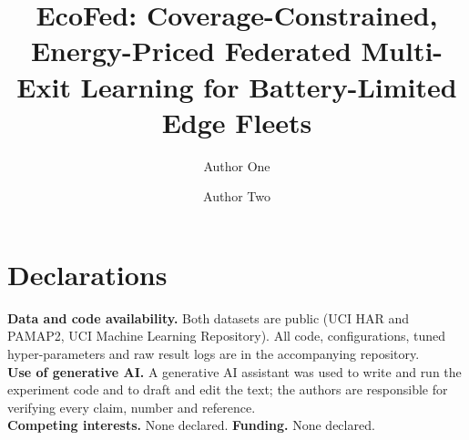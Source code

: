 \documentclass[preprint,12pt,authoryear]{elsarticle}
\begin{document}
\begin{frontmatter}
\title{EcoFed: Coverage-Constrained, Energy-Priced Federated Multi-Exit Learning for Battery-Limited Edge Fleets}
\author[a]{Author One}
\author[a]{Author Two}

\end{frontmatter}









\section*{Declarations}
\textbf{Data and code availability.} Both datasets are public (UCI HAR and PAMAP2, UCI Machine Learning Repository). All code, configurations, tuned hyper-parameters and raw result logs are in the accompanying repository.\\
\textbf{Use of generative AI.} A generative AI assistant was used to write and run the experiment code and to draft and edit the text; the authors are responsible for verifying every claim, number and reference.\\
\textbf{Competing interests.} None declared. \textbf{Funding.} None declared.



\appendix


\end{document}
